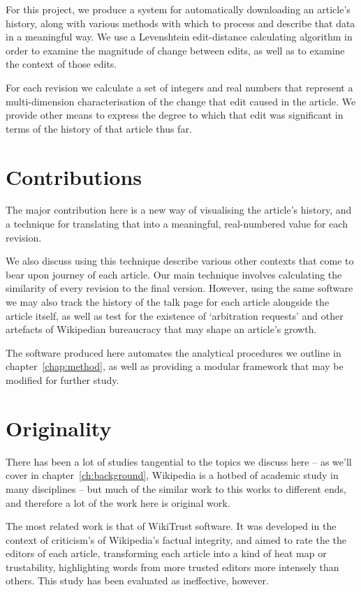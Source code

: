 For this project, we produce a system for automatically downloading an
article's history, along with various methods with which to process
and describe that data in a meaningful way. We use a Levenshtein
edit-distance calculating algorithm in order to examine the magnitude
of change between edits, as well as to examine the context of those
edits.

For each revision we calculate a set of integers and real numbers that
represent a multi-dimension characterisation of the change that edit
caused in the article. We provide other means to express the degree to
which that edit was significant in terms of the history of that
article thus far.

\section{Contributions}

The major contribution here is a new way of visualising the article's
history, and a technique for translating that into a meaningful,
real-numbered value for each revision.

We also discuss using this technique describe various other contexts
that come to bear upon journey of each article. Our main technique
involves calculating the similarity of every revision to the final
version. However, using the same software we may also track the
history of the talk page for each article alongside the article
itself, as well as test for the existence of `arbitration requests'
and other artefacts of Wikipedian bureaucracy that may shape an
article's growth.

The software produced here automates the analytical procedures we
outline in chapter~\ref{chap:method}, as well as providing a modular
framework that may be modified for further study.

\section{Originality}
There has been a lot of studies tangential to the topics we discuss
here -- as we'll cover in chapter~\ref{ch:background}, Wikipedia is a
hotbed of academic study in many disciplines -- but much of the
similar work to this works to different ends, and therefore a lot of
the work here is original work.

The most related work is that of WikiTrust software. It was developed
in the context of criticism's of Wikipedia's factual integrity, and
aimed to rate the the editors of each article, transforming each
article into a kind of heat map or trustability, highlighting words
from more trusted editors more intensely than
others.\cite{adler2012wikitrust} This study has been evaluated as
ineffective, however.\cite{Lucassen2011}


